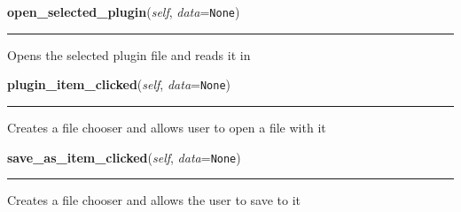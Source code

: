 \hspace{.8\funcindent}\begin{boxedminipage}{\funcwidth}

    \raggedright \textbf{open\_selected\_plugin}(\textit{self}, \textit{data}={\tt None})

    \vspace{-1.5ex}

    \rule{\textwidth}{0.5\fboxrule}
\setlength{\parskip}{2ex}
    Opens the selected plugin file and reads it in

\setlength{\parskip}{1ex}
    \end{boxedminipage}

    \label{cuon:Editor:editor:editorwindow:plugin_item_clicked}

    \vspace{0.5ex}

\hspace{.8\funcindent}\begin{boxedminipage}{\funcwidth}

    \raggedright \textbf{plugin\_item\_clicked}(\textit{self}, \textit{data}={\tt None})

    \vspace{-1.5ex}

    \rule{\textwidth}{0.5\fboxrule}
\setlength{\parskip}{2ex}
    Creates a file chooser and allows user to open a file with it

\setlength{\parskip}{1ex}
    \end{boxedminipage}

    \label{cuon:Editor:editor:editorwindow:save_as_item_clicked}

    \vspace{0.5ex}

\hspace{.8\funcindent}\begin{boxedminipage}{\funcwidth}

    \raggedright \textbf{save\_as\_item\_clicked}(\textit{self}, \textit{data}={\tt None})

    \vspace{-1.5ex}

    \rule{\textwidth}{0.5\fboxrule}
\setlength{\parskip}{2ex}
    Creates a file chooser and allows the user to save to it

\setlength{\parskip}{1ex}
    \end{boxedminipage}

